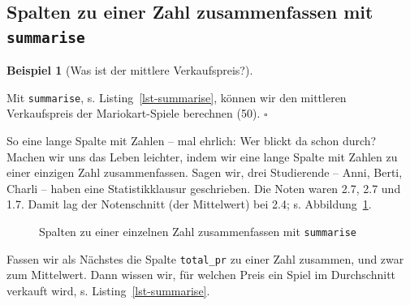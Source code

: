 \documentclass[
  letterpaper,
  twoside,
  open=any]{scrbook}
\theoremstyle{definition}
\theoremstyle{definition}
\theoremstyle{definition}
\newtheorem{example}{Beispiel}[chapter]
\theoremstyle{remark}
\begin{document}
\subsection{\texorpdfstring{Spalten zu einer Zahl zusammenfassen mit
\texttt{summarise}}{Spalten zu einer Zahl zusammenfassen mit summarise}}\label{spalten-zu-einer-zahl-zusammenfassen-mit-summarise}

\begin{example}[Was ist der mittlere
Verkaufspreis?]\protect\hypertarget{exm-summarise}{}\label{exm-summarise}

Mit \texttt{summarise}, s. Listing~\ref{lst-summarise}, können wir den
mittleren Verkaufspreis der Mariokart-Spiele berechnen (50). \(\square\)

\end{example}

So eine lange Spalte mit Zahlen -- mal ehrlich: Wer blickt da schon
durch? Machen wir uns das Leben leichter, indem wir eine lange Spalte
mit Zahlen zu einer einzigen Zahl zusammenfassen. Sagen wir, drei
Studierende -- Anni, Berti, Charli -- haben eine Statistikklausur
geschrieben. Die Noten waren 2.7, 2.7 und 1.7. Damit lag der
Notenschnitt (der Mittelwert) bei 2.4; s. Abbildung~\ref{fig-summarise}.

\begin{figure}


\caption{\label{fig-summarise}Spalten zu einer einzelnen Zahl
zusammenfassen mit \texttt{summarise}}

\end{figure}%

Fassen wir als Nächstes die Spalte \texttt{total\_pr} zu einer Zahl
zusammen, und zwar zum Mittelwert. Dann wissen wir, für welchen Preis
ein Spiel im Durchschnitt verkauft wird, s. Listing~\ref{lst-summarise}.
\end{document}
